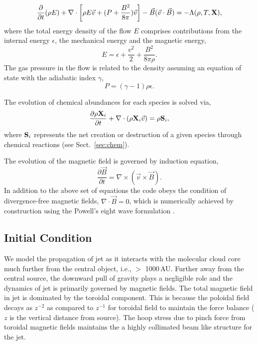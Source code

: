 \documentclass[useAMS,usenatbib,letters]{mn2e}
\begin{document}
\begin{equation}\label{encons1}
\frac{\partial}{\partial t}(\rho E)
+ \nabla \cdot\left[ \rho E \vec{v} + (P + \frac{B^2}{8\pi})\vec{v}\right]  
- \vec{B}(\vec{v}\cdot\vec{B}) = -\Lambda(\rho,T,{\bf{X}}),
\end{equation}
%
%
where the total energy density of the flow $E$ comprises contributions from 
the internal energy $\epsilon$, the mechanical energy and the magnetic energy,
%
\begin{equation}\label{encons2}
 E = \epsilon + \frac{v^2}{2} + \frac{B^2}{8 \pi \rho}.
\end{equation}
The gas pressure in the flow is related to the density assuming an equation 
of state with the adiabatic index $\gamma$,
%
\begin{equation}\label{EOS}
P = (\gamma - 1) \rho \epsilon.
\end{equation}

The evolution of chemical abundances for each species is solved via,
%
\begin{equation}\label{chemevol}
\frac{\partial \rho{\bf{X}}_{i}}{\partial t} + \nabla \cdot (\rho
{\bf{X}}_{i} \vec{v})  = \rho {\bf{S}}_{i},
\end{equation}
where ${\bf{S}}_{i}$ represents the net creation or destruction of a
given species through chemical reactions (see Sect.~\ref{sec:chem}).

The evolution of the magnetic field is governed by induction equation,
%
\begin{equation}\label{induction}
\frac{\partial \vec{B}}{\partial t} = \nabla \times \left(\vec{v}\times \vec{B}\right).
\end{equation}
%
In addition to the above set of equations the code obeys the condition of divergence-free 
magnetic fields, $\nabla \cdot \vec{B} = 0$, which is numerically achieved by construction 
using the Powell's eight wave formulation \citep{Powell:1999p14822}.

\subsection{Initial Condition}
We model the propagation of jet as it interacts with the molecular
cloud core much further from the central object, i.e., $>$ 1000\,AU. 
Further away from the central source, the downward pull of gravity plays a
negligible role and the dynamics of jet is primarily governed by magnetic fields.
The total magnetic field in jet is dominated by the toroidal
component. This is because the poloidal field decays as $z^{-2}$ as
compared to $z^{-1}$ for toroidal field to maintain the force balance ($z$ is the vertical distance from source). 
The hoop stress due to pinch force from toroidal magnetic fields maintains the
a highly collimated beam like structure for the jet.
%
\end{document}

